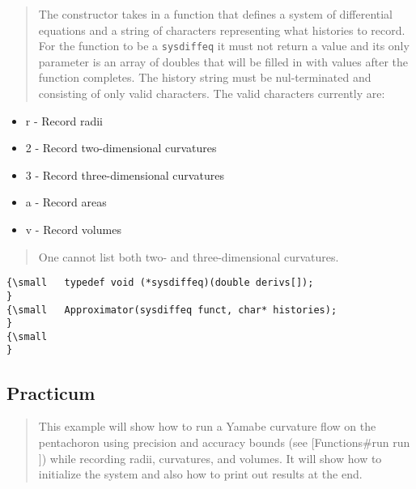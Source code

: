\begin{quotation}
The constructor takes in a function that defines a system of differential
equations and a string of characters representing what histories to record.
For the function to be a \texttt{sysdiffeq} it must not return a value and
its only parameter is an array of doubles that will be filled in with values
after the function completes. The history string must be nul-terminated and
consisting of only valid characters. The valid characters currently are:
\end{quotation}

\begin{itemize}
\item r - Record radii

\item 2 - Record two-dimensional curvatures

\item 3 - Record three-dimensional curvatures

\item a - Record areas

\item v - Record volumes
\end{itemize}

\begin{quotation}
One cannot list both two- and three-dimensional curvatures.{\small }
\end{quotation}

\begin{verbatim}
{\small   typedef void (*sysdiffeq)(double derivs[]);
}
{\small   Approximator(sysdiffeq funct, char* histories);
}
{\small   
}
\end{verbatim}

\subsection*{Practicum}

\begin{quotation}
This example will show how to run a Yamabe curvature flow on the pentachoron
using precision and accuracy bounds (see \mbox{$[$}Functions\#run run%
\mbox{$]$}) while recording radii, curvatures, and volumes. It will show how
to initialize the system and also how to print out results at the end.%
{\small }
\end{quotation}


